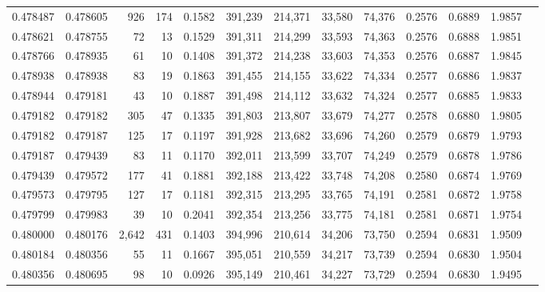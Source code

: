 \begin{tabular}{rrrrrrrrrrrrr}
0.478487 & 0.478605 &   926 & 174 &                                     0.1582 & 391,239 & 214,371 &  33,580 &  74,376 & 0.2576 & 0.6889 & 1.9857 \\
0.478621 & 0.478755 &    72 &  13 &                                     0.1529 & 391,311 & 214,299 &  33,593 &  74,363 & 0.2576 & 0.6888 & 1.9851 \\
0.478766 & 0.478935 &    61 &  10 &                                     0.1408 & 391,372 & 214,238 &  33,603 &  74,353 & 0.2576 & 0.6887 & 1.9845 \\
0.478938 & 0.478938 &    83 &  19 &                                     0.1863 & 391,455 & 214,155 &  33,622 &  74,334 & 0.2577 & 0.6886 & 1.9837 \\
0.478944 & 0.479181 &    43 &  10 &                                     0.1887 & 391,498 & 214,112 &  33,632 &  74,324 & 0.2577 & 0.6885 & 1.9833 \\
0.479182 & 0.479182 &   305 &  47 &                                     0.1335 & 391,803 & 213,807 &  33,679 &  74,277 & 0.2578 & 0.6880 & 1.9805 \\
0.479182 & 0.479187 &   125 &  17 &                                     0.1197 & 391,928 & 213,682 &  33,696 &  74,260 & 0.2579 & 0.6879 & 1.9793 \\
0.479187 & 0.479439 &    83 &  11 &                                     0.1170 & 392,011 & 213,599 &  33,707 &  74,249 & 0.2579 & 0.6878 & 1.9786 \\
0.479439 & 0.479572 &   177 &  41 &                                     0.1881 & 392,188 & 213,422 &  33,748 &  74,208 & 0.2580 & 0.6874 & 1.9769 \\
0.479573 & 0.479795 &   127 &  17 &                                     0.1181 & 392,315 & 213,295 &  33,765 &  74,191 & 0.2581 & 0.6872 & 1.9758 \\
0.479799 & 0.479983 &    39 &  10 &                                     0.2041 & 392,354 & 213,256 &  33,775 &  74,181 & 0.2581 & 0.6871 & 1.9754 \\
0.480000 & 0.480176 & 2,642 & 431 &                                     0.1403 & 394,996 & 210,614 &  34,206 &  73,750 & 0.2594 & 0.6831 & 1.9509 \\
0.480184 & 0.480356 &    55 &  11 &                                     0.1667 & 395,051 & 210,559 &  34,217 &  73,739 & 0.2594 & 0.6830 & 1.9504 \\
0.480356 & 0.480695 &    98 &  10 &                                     0.0926 & 395,149 & 210,461 &  34,227 &  73,729 & 0.2594 & 0.6830 & 1.9495 \\

\end{tabular}
